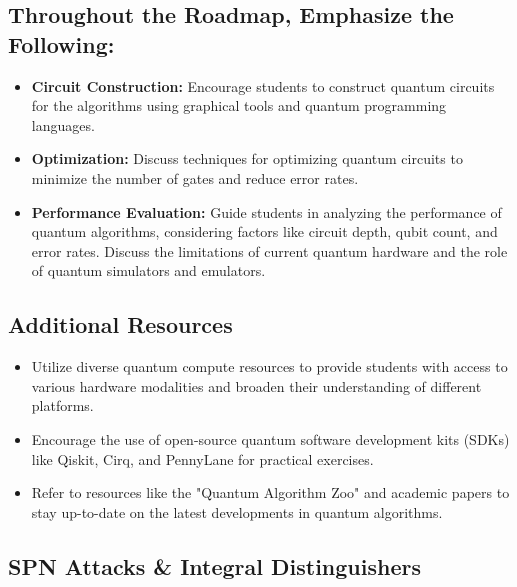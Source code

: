 \subsection{Throughout the Roadmap, Emphasize the Following:}

\begin{itemize}
    \item \textbf{Circuit Construction:} Encourage students to construct quantum circuits for the algorithms using graphical tools and quantum programming languages.
    \item \textbf{Optimization:} Discuss techniques for optimizing quantum circuits to minimize the number of gates and reduce error rates.
    \item \textbf{Performance Evaluation:} Guide students in analyzing the performance of quantum algorithms, considering factors like circuit depth, qubit count, and error rates. Discuss the limitations of current quantum hardware and the role of quantum simulators and emulators.
\end{itemize}

\subsection{Additional Resources}

\begin{itemize}
    \item Utilize diverse quantum compute resources to provide students with access to various hardware modalities and broaden their understanding of different platforms.
    \item Encourage the use of open-source quantum software development kits (SDKs) like Qiskit, Cirq, and PennyLane for practical exercises.
    \item Refer to resources like the "Quantum Algorithm Zoo" and academic papers to stay up-to-date on the latest developments in quantum algorithms.
\end{itemize}


\subsection{SPN Attacks \& Integral Distinguishers}


